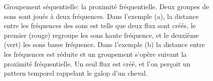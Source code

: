 \begin{figure}[bth]
        \myfloatalign
        \caption[Groupement séquentiel : proximité fréquentielle.]{Groupement séquentielle: la proximité fréquentielle. Deux groupes de sons sont joués à deux fréquences. Dans l'exemple (a), la distance entre les fréquences des sons est telle que deux flux sont créés, le premier (rouge) regroupe les sons haute fréquence, et le deuxième (vert) les sons basse fréquence. Dans l'exemple (b) la distance entre les fréquences est réduite et un groupement s'opère suivant la proximité fréquentielle. Un seul flux est créé, et l'on perçoit un pattern temporel rappelant le galop d'un cheval.}\label{fig:galop}
\end{figure}

